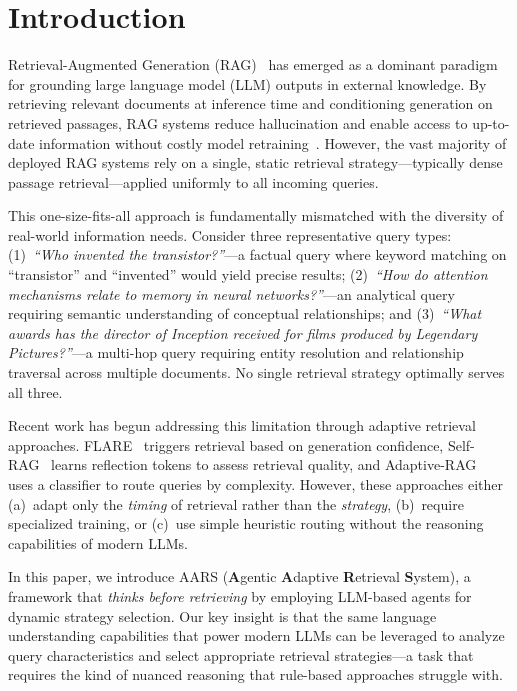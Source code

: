 \documentclass[runningheads]{llncs}
\begin{document}
\section{Introduction}
\label{sec:introduction}

Retrieval-Augmented Generation (RAG)~\cite{Lewis2020} has emerged as a dominant paradigm for grounding large language model (LLM) outputs in external knowledge. By retrieving relevant documents at inference time and conditioning generation on retrieved passages, RAG systems reduce hallucination and enable access to up-to-date information without costly model retraining~\cite{Guu2020,Borgeaud2022}. However, the vast majority of deployed RAG systems rely on a single, static retrieval strategy---typically dense passage retrieval---applied uniformly to all incoming queries.

This one-size-fits-all approach is fundamentally mismatched with the diversity of real-world information needs. Consider three representative query types: (1)~\textit{``Who invented the transistor?''}---a factual query where keyword matching on ``transistor'' and ``invented'' would yield precise results; (2)~\textit{``How do attention mechanisms relate to memory in neural networks?''}---an analytical query requiring semantic understanding of conceptual relationships; and (3)~\textit{``What awards has the director of Inception received for films produced by Legendary Pictures?''}---a multi-hop query requiring entity resolution and relationship traversal across multiple documents. No single retrieval strategy optimally serves all three.

Recent work has begun addressing this limitation through adaptive retrieval approaches. FLARE~\cite{Jiang2023} triggers retrieval based on generation confidence, Self-RAG~\cite{Asai2023} learns reflection tokens to assess retrieval quality, and Adaptive-RAG~\cite{Jeong2024} uses a classifier to route queries by complexity. However, these approaches either (a)~adapt only the \textit{timing} of retrieval rather than the \textit{strategy}, (b)~require specialized training, or (c)~use simple heuristic routing without the reasoning capabilities of modern LLMs.

In this paper, we introduce AARS (\textbf{A}gentic \textbf{A}daptive \textbf{R}etrieval \textbf{S}ystem), a framework that \textit{thinks before retrieving} by employing LLM-based agents for dynamic strategy selection. Our key insight is that the same language understanding capabilities that power modern LLMs can be leveraged to analyze query characteristics and select appropriate retrieval strategies---a task that requires the kind of nuanced reasoning that rule-based approaches struggle with.
\end{document}
